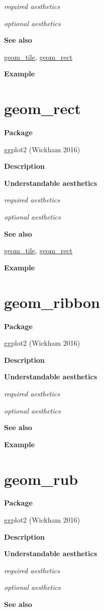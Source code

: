 \documentclass[
  letterpaper,
  DIV=11,
  numbers=noendperiod]{scrreprt}
\begin{document}
\emph{required aesthetics}

\emph{optional aesthetics}

\textbf{See also}

\hyperref[tile]{geom\_tile}, \hyperref[rect]{geom\_rect}

\textbf{Example}

\section{geom\_rect}\label{geom_rect}

\textbf{Package}

ggplot2 (Wickham 2016)

\textbf{Description}

\textbf{Understandable aesthetics}

\emph{required aesthetics}

\emph{optional aesthetics}

\textbf{See also}

\hyperref[tile]{geom\_tile}, \hyperref[rect]{geom\_rect}

\textbf{Example}

\section{geom\_ribbon}\label{geom_ribbon}

\textbf{Package}

ggplot2 (Wickham 2016)

\textbf{Description}

\textbf{Understandable aesthetics}

\emph{required aesthetics}

\emph{optional aesthetics}

\textbf{See also}

\textbf{Example}

\section{geom\_rub}\label{geom_rub}

\textbf{Package}

ggplot2 (Wickham 2016)

\textbf{Description}

\textbf{Understandable aesthetics}

\emph{required aesthetics}

\emph{optional aesthetics}

\textbf{See also}
\end{document}
